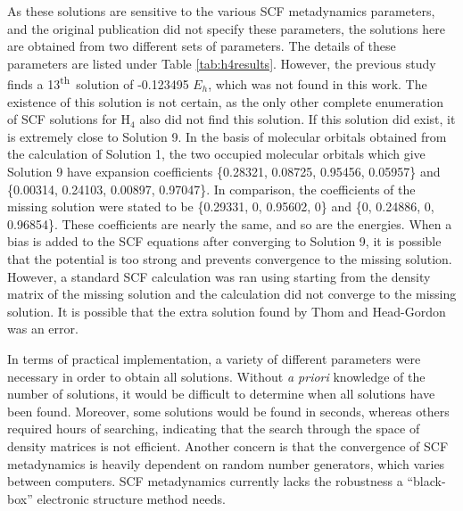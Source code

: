 \documentclass[final,3p,times,twocolumn]{elsarticle}
\newcommand{\ssth}{\textsuperscript{th}}
\begin{document}
As these solutions are sensitive to the various SCF metadynamics parameters, and the original publication did not specify these parameters, the solutions here are obtained from two different sets of parameters. The details of these parameters are listed under Table \ref{tab:h4results}. However, the previous study\cite{scfmd} finds a 13\ssth\ solution of -0.123495 $E_h$, which was not found in this work. The existence of this solution is not certain, as the only other complete enumeration of SCF solutions for H$_4$ also did not find this solution.\cite{jankowski-1998} If this solution did exist, it is extremely close to Solution 9. In the basis of molecular orbitals obtained from the calculation of Solution 1, the two occupied molecular orbitals which give Solution 9 have expansion coefficients \{0.28321, 0.08725, 0.95456, 0.05957\} and \{0.00314, 0.24103, 0.00897, 0.97047\}. In comparison, the coefficients of the missing solution were stated to be \{0.29331, 0, 0.95602, 0\} and \{0, 0.24886, 0, 0.96854\}.\cite{scfmd} These coefficients are nearly the same, and so are the energies. When a bias is added to the SCF equations after converging to Solution 9, it is possible that the potential is too strong and prevents convergence to the missing solution. However, a standard SCF calculation was ran using starting from the density matrix of the missing solution and the calculation did not converge to the missing solution. It is possible that the extra solution found by Thom and Head-Gordon\cite{scfmd} was an error.


In terms of practical implementation, a variety of different parameters were necessary in order to obtain all solutions. Without \textit{a priori} knowledge of the number of solutions, it would be difficult to determine when all solutions have been found. Moreover, some solutions would be found in seconds, whereas others required hours of searching, indicating that the search through the space of density matrices is not efficient. Another concern is that the convergence of SCF metadynamics is heavily dependent on random number generators, which varies between computers. SCF metadynamics currently lacks the robustness a ``black-box'' electronic structure method needs.
\end{document}
